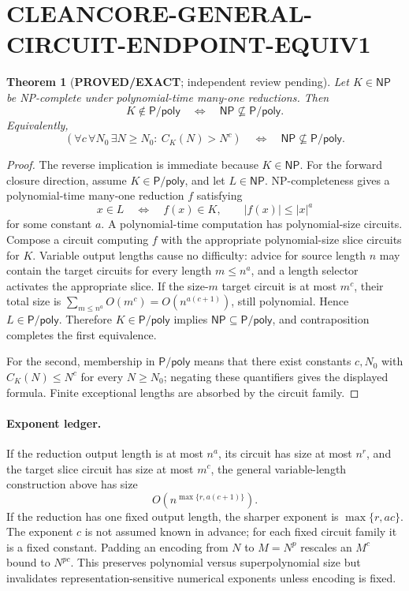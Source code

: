 \documentclass[11pt]{article}
\newtheorem{theorem}{Theorem}
\newcommand{\NP}{\mathsf{NP}}
\begin{document}
\section*{CLEANCORE-GENERAL-CIRCUIT-ENDPOINT-EQUIV1}

\begin{theorem}[\textbf{PROVED/EXACT}; independent review pending]
Let \(K\in\NP\) be NP-complete under polynomial-time many-one reductions.  Then
\[
K\notin\mathsf{P/poly}
\quad\Longleftrightarrow\quad
\NP\not\subseteq\mathsf{P/poly}.
\]
Equivalently,
\[
\left(\forall c\,\forall N_0\,\exists N\ge N_0:\ C_K(N)>N^c\right)
\quad\Longleftrightarrow\quad
\NP\not\subseteq\mathsf{P/poly}.
\]
\end{theorem}

\begin{proof}
The reverse implication is immediate because \(K\in\NP\).  For the forward closure direction, assume \(K\in\mathsf{P/poly}\), and let \(L\in\NP\).  NP-completeness gives a polynomial-time many-one reduction \(f\) satisfying
\[
x\in L\quad\Longleftrightarrow\quad f(x)\in K,
\qquad |f(x)|\le |x|^a
\]
for some constant \(a\).  A polynomial-time computation has polynomial-size circuits.  Compose a circuit computing \(f\) with the appropriate polynomial-size slice circuits for \(K\).  Variable output lengths cause no difficulty: advice for source length \(n\) may contain the target circuits for every length \(m\le n^a\), and a length selector activates the appropriate slice.  If the size-\(m\) target circuit is at most \(m^c\), their total size is \(\sum_{m\le n^a}O(m^c)=O(n^{a(c+1)})\), still polynomial.  Hence \(L\in\mathsf{P/poly}\).  Therefore \(K\in\mathsf{P/poly}\) implies \(\NP\subseteq\mathsf{P/poly}\), and contraposition completes the first equivalence.

For the second, membership in \(\mathsf{P/poly}\) means that there exist constants \(c,N_0\) with \(C_K(N)\le N^c\) for every \(N\ge N_0\); negating these quantifiers gives the displayed formula.  Finite exceptional lengths are absorbed by the circuit family.
\end{proof}

\paragraph{Exponent ledger.}
If the reduction output length is at most \(n^a\), its circuit has size at most \(n^r\), and the target slice circuit has size at most \(m^c\), the general variable-length construction above has size
\[
O\!\left(n^{\max\{r,a(c+1)\}}\right).
\]
If the reduction has one fixed output length, the sharper exponent is \(\max\{r,ac\}\).  The exponent \(c\) is not assumed known in advance; for each fixed circuit family it is a fixed constant.  Padding an encoding from \(N\) to \(M=N^p\) rescales an \(M^c\) bound to \(N^{pc}\).  This preserves polynomial versus superpolynomial size but invalidates representation-sensitive numerical exponents unless encoding is fixed.
\end{document}
